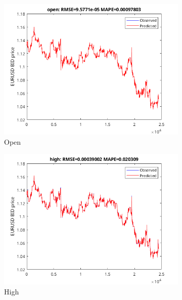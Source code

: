 \documentclass[11pt]{article}
\begin{document}
\begin{figure}[H]
    \begin{subfigure}[b]{0.5\textwidth}
      \includegraphics[width=\textwidth,keepaspectratio]{figs/var20open.png}
      \caption{Open}
    \end{subfigure}
    \quad\quad\quad\quad\quad\quad\quad
    \begin{subfigure}[b]{0.5\textwidth}
      \includegraphics[width=\textwidth,keepaspectratio]{figs/var20high.png}
      \caption{High}
    \end{subfigure}\\
    \begin{subfigure}[b]{0.5\textwidth}

\end{subfigure}
\end{figure}
\end{document}
